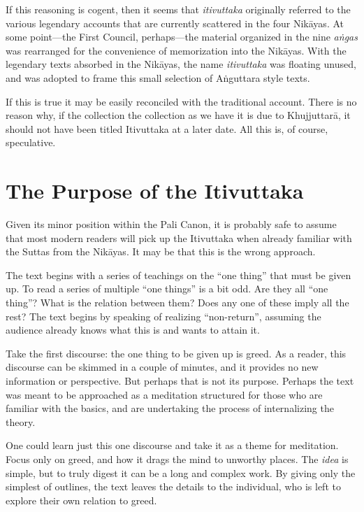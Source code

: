 \documentclass[12pt,openany]{book}%
\begin{document}
If this reasoning is cogent, then it seems that \emph{itivuttaka} originally referred to the various legendary accounts that are currently scattered in the four \textsanskrit{Nikāyas}. At some point—the First Council, perhaps—the material organized in the nine  \emph{\textsanskrit{aṅgas}} was rearranged for the convenience of memorization into the \textsanskrit{Nikāyas}. With the legendary texts absorbed in the \textsanskrit{Nikāyas}, the name \emph{itivuttaka} was floating unused, and was adopted to frame this small selection of \textsanskrit{Aṅguttara} style texts.

If this is true it may be easily reconciled with the traditional account. There is no reason why, if the collection the collection as we have it is due to \textsanskrit{Khujjuttarā}, it should not have been titled Itivuttaka at a later date. All this is, of course, speculative.

\section*{The Purpose of the Itivuttaka}

Given its minor position within the Pali Canon, it is probably safe to assume that most modern readers will pick up the Itivuttaka when already familiar with the Suttas from the \textsanskrit{Nikāyas}. It may be that this is the wrong approach.

The text begins with a series of teachings on the “one thing” that must be given up. To read a series of multiple “one things” is a bit odd. Are they all “one thing”? What is the relation between them? Does any one of these imply all the rest? The text begins by speaking of realizing “non-return”, assuming the audience already knows what this is and wants to attain it.

Take the first discourse: the one thing to be given up is greed. As a reader, this discourse can be skimmed in a couple of minutes, and it provides no new information or perspective. But perhaps that is not its purpose. Perhaps the text was meant to be approached as a meditation structured for those who are familiar with the basics, and are undertaking the process of internalizing the theory.

One could learn just this one discourse and take it as a theme for meditation. Focus only on greed, and how it drags the mind to unworthy places. The \emph{idea} is simple, but to truly digest it can be a long and complex work. By giving only the simplest of outlines, the text leaves the details to the individual, who is left to explore their own relation to greed.
\end{document}
